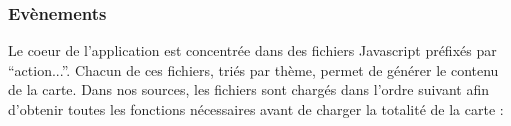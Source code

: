 



\subsubsection{Evènements}


Le coeur de l'application est concentrée dans des fichiers Javascript préfixés par ``action...''. Chacun de ces fichiers, triés par thème, permet de générer le contenu de la carte. Dans nos sources, les fichiers sont chargés dans l'ordre suivant afin d'obtenir toutes les fonctions nécessaires avant de charger la totalité de la carte : 

